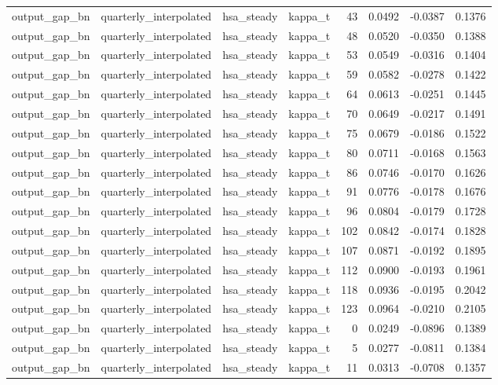 \begin{tabular}{llllrrrr}
output\_gap\_bn & quarterly\_interpolated & hsa\_steady & kappa\_t & 43 & 0.0492 & -0.0387 & 0.1376 \\
output\_gap\_bn & quarterly\_interpolated & hsa\_steady & kappa\_t & 48 & 0.0520 & -0.0350 & 0.1388 \\
output\_gap\_bn & quarterly\_interpolated & hsa\_steady & kappa\_t & 53 & 0.0549 & -0.0316 & 0.1404 \\
output\_gap\_bn & quarterly\_interpolated & hsa\_steady & kappa\_t & 59 & 0.0582 & -0.0278 & 0.1422 \\
output\_gap\_bn & quarterly\_interpolated & hsa\_steady & kappa\_t & 64 & 0.0613 & -0.0251 & 0.1445 \\
output\_gap\_bn & quarterly\_interpolated & hsa\_steady & kappa\_t & 70 & 0.0649 & -0.0217 & 0.1491 \\
output\_gap\_bn & quarterly\_interpolated & hsa\_steady & kappa\_t & 75 & 0.0679 & -0.0186 & 0.1522 \\
output\_gap\_bn & quarterly\_interpolated & hsa\_steady & kappa\_t & 80 & 0.0711 & -0.0168 & 0.1563 \\
output\_gap\_bn & quarterly\_interpolated & hsa\_steady & kappa\_t & 86 & 0.0746 & -0.0170 & 0.1626 \\
output\_gap\_bn & quarterly\_interpolated & hsa\_steady & kappa\_t & 91 & 0.0776 & -0.0178 & 0.1676 \\
output\_gap\_bn & quarterly\_interpolated & hsa\_steady & kappa\_t & 96 & 0.0804 & -0.0179 & 0.1728 \\
output\_gap\_bn & quarterly\_interpolated & hsa\_steady & kappa\_t & 102 & 0.0842 & -0.0174 & 0.1828 \\
output\_gap\_bn & quarterly\_interpolated & hsa\_steady & kappa\_t & 107 & 0.0871 & -0.0192 & 0.1895 \\
output\_gap\_bn & quarterly\_interpolated & hsa\_steady & kappa\_t & 112 & 0.0900 & -0.0193 & 0.1961 \\
output\_gap\_bn & quarterly\_interpolated & hsa\_steady & kappa\_t & 118 & 0.0936 & -0.0195 & 0.2042 \\
output\_gap\_bn & quarterly\_interpolated & hsa\_steady & kappa\_t & 123 & 0.0964 & -0.0210 & 0.2105 \\
output\_gap\_bn & quarterly\_interpolated & hsa\_steady & kappa\_t & 0 & 0.0249 & -0.0896 & 0.1389 \\
output\_gap\_bn & quarterly\_interpolated & hsa\_steady & kappa\_t & 5 & 0.0277 & -0.0811 & 0.1384 \\
output\_gap\_bn & quarterly\_interpolated & hsa\_steady & kappa\_t & 11 & 0.0313 & -0.0708 & 0.1357 \\

\end{tabular}

